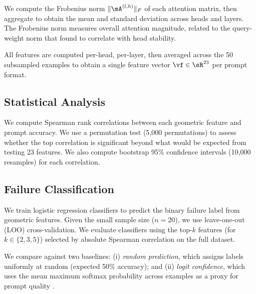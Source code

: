 We compute the Frobenius norm $\|\mA^{(l,h)}\|_F$ of each attention matrix, then aggregate to obtain the mean and standard deviation across heads and layers.
The Frobenius norm measures overall attention magnitude, related to the query-weight norm that \citet{bali2026quantifying} found to correlate with head stability.

All features are computed per-head, per-layer, then averaged across the 50 subsampled examples to obtain a single feature vector $\vf \in \sR^{23}$ per prompt format.

\subsection{Statistical Analysis}
\label{sec:analysis}

We compute Spearman rank correlations between each geometric feature and prompt accuracy.
We use a permutation test (5{,}000 permutations) to assess whether the top correlation is significant beyond what would be expected from testing 23 features.
We also compute bootstrap 95\% confidence intervals (10{,}000 resamples) for each correlation.

\subsection{Failure Classification}
\label{sec:classifier}

We train logistic regression classifiers to predict the binary failure label from geometric features.
Given the small sample size ($n = 20$), we use leave-one-out (LOO) cross-validation.
We evaluate classifiers using the top-$k$ features (for $k \in \{2, 3, 5\}$) selected by absolute Spearman correlation on the full dataset.

We compare against two baselines: (i) \emph{random prediction}, which assigns labels uniformly at random (expected 50\% accuracy); and (ii) \emph{logit confidence}, which uses the mean maximum softmax probability across examples as a proxy for prompt quality \citep{hendrycks2017baseline}.
